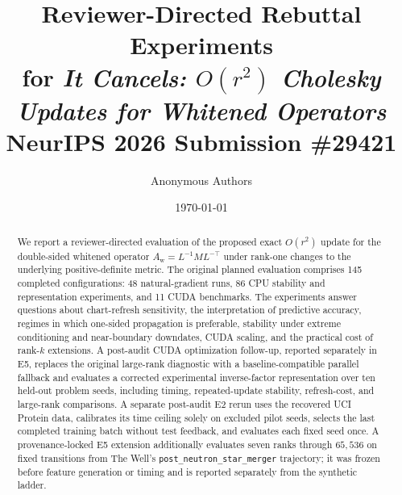 \documentclass[11pt]{article}
\title{\textbf{Reviewer-Directed Rebuttal Experiments}\\
\large for \emph{It Cancels: \(O(r^2)\) Cholesky Updates for Whitened Operators}\\
\normalsize NeurIPS 2026 Submission \#29421}
\author{Anonymous Authors}
\date{\today}
\newcommand{\Aw}{A_{\mathrm w}}
\begin{document}
\maketitle

\begin{abstract}
We report a reviewer-directed evaluation of the proposed exact
\(O(r^2)\) update for the double-sided whitened operator
\(\Aw=L^{-1}ML^{-\top}\) under rank-one changes to the underlying
positive-definite metric.  The original planned evaluation comprises 145
completed configurations: 48 natural-gradient runs, 86 CPU stability and
representation experiments, and 11 CUDA benchmarks.  The experiments answer
questions about chart-refresh sensitivity, the interpretation of predictive
accuracy, regimes in which one-sided propagation is preferable, stability
under extreme conditioning and near-boundary downdates, CUDA scaling, and the
practical cost of rank-\(k\) extensions.
A post-audit CUDA optimization follow-up, reported separately in E5, replaces
the original large-rank diagnostic with a baseline-compatible parallel
fallback and evaluates a corrected experimental inverse-factor
representation over ten held-out problem seeds, including timing,
repeated-update stability, refresh-cost, and large-rank comparisons.
A separate post-audit E2 rerun uses the recovered UCI Protein data, calibrates
its time ceiling solely on excluded pilot seeds, selects the last completed
training batch without test feedback, and evaluates each fixed seed once.
A provenance-locked E5 extension additionally evaluates seven ranks through
\(65{,}536\) on fixed transitions from The Well's
\texttt{post\_neutron\_star\_merger} trajectory; it was frozen before feature
generation or timing and is reported separately from the synthetic ladder.


\end{abstract}
\end{document}
